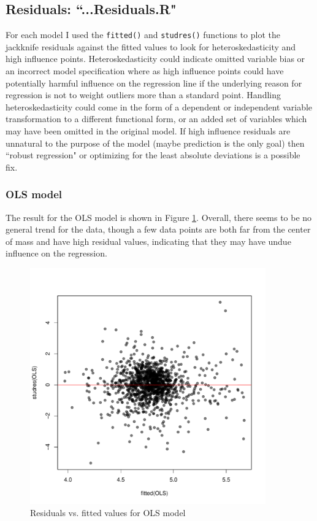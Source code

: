 \documentclass{article}
\begin{document}
\subsection{Residuals: ``...Residuals.R"}
For each model I used the \verb|fitted()| and \verb|studres()| functions to plot the jackknife residuals against the fitted values to look for heteroskedasticity and high influence points. Heteroskedasticity could indicate omitted variable bias or an incorrect model specification where as high influence points could have potentially harmful influence on the regression line if the underlying reason for regression is not to weight outliers more than a standard point. Handling heteroskedasticity could come in the form of a dependent or independent variable transformation to a different functional form, or an added set of variables which may have been omitted in the original model. If high influence residuals are unnatural to the purpose of the model (maybe prediction is the only goal) then ``robust regression" or optimizing for the least absolute deviations is a possible fix.

\subsubsection{OLS model}
The result for the OLS model is shown in Figure \ref{ols residuals}. Overall, there seems to be no general trend for the data, though a few data points are both far from the center of mass and have high residual values, indicating that they may have undue influence on the regression.

\begin{figure}[H]
\centering
\includegraphics[width = 4in]{figures/residuals1.pdf}
\caption{Residuals vs. fitted values for OLS model}
\label{ols residuals}
\end{figure}
\end{document}
